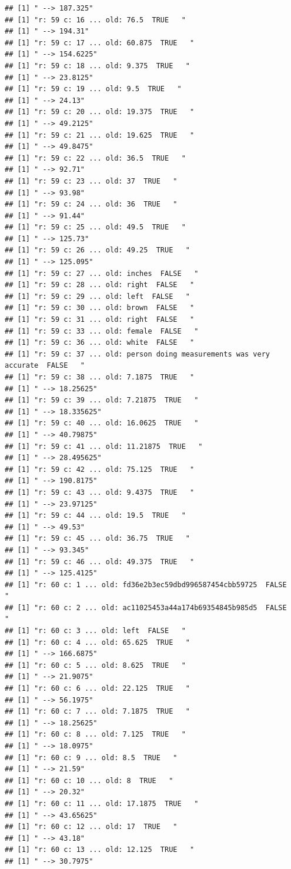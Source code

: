 \documentclass[]{article}
\begin{document}
\begin{verbatim}
## [1] " --> 187.325"
## [1] "r: 59 c: 16 ... old: 76.5  TRUE   "
## [1] " --> 194.31"
## [1] "r: 59 c: 17 ... old: 60.875  TRUE   "
## [1] " --> 154.6225"
## [1] "r: 59 c: 18 ... old: 9.375  TRUE   "
## [1] " --> 23.8125"
## [1] "r: 59 c: 19 ... old: 9.5  TRUE   "
## [1] " --> 24.13"
## [1] "r: 59 c: 20 ... old: 19.375  TRUE   "
## [1] " --> 49.2125"
## [1] "r: 59 c: 21 ... old: 19.625  TRUE   "
## [1] " --> 49.8475"
## [1] "r: 59 c: 22 ... old: 36.5  TRUE   "
## [1] " --> 92.71"
## [1] "r: 59 c: 23 ... old: 37  TRUE   "
## [1] " --> 93.98"
## [1] "r: 59 c: 24 ... old: 36  TRUE   "
## [1] " --> 91.44"
## [1] "r: 59 c: 25 ... old: 49.5  TRUE   "
## [1] " --> 125.73"
## [1] "r: 59 c: 26 ... old: 49.25  TRUE   "
## [1] " --> 125.095"
## [1] "r: 59 c: 27 ... old: inches  FALSE   "
## [1] "r: 59 c: 28 ... old: right  FALSE   "
## [1] "r: 59 c: 29 ... old: left  FALSE   "
## [1] "r: 59 c: 30 ... old: brown  FALSE   "
## [1] "r: 59 c: 31 ... old: right  FALSE   "
## [1] "r: 59 c: 33 ... old: female  FALSE   "
## [1] "r: 59 c: 36 ... old: white  FALSE   "
## [1] "r: 59 c: 37 ... old: person doing measurements was very accurate  FALSE   "
## [1] "r: 59 c: 38 ... old: 7.1875  TRUE   "
## [1] " --> 18.25625"
## [1] "r: 59 c: 39 ... old: 7.21875  TRUE   "
## [1] " --> 18.335625"
## [1] "r: 59 c: 40 ... old: 16.0625  TRUE   "
## [1] " --> 40.79875"
## [1] "r: 59 c: 41 ... old: 11.21875  TRUE   "
## [1] " --> 28.495625"
## [1] "r: 59 c: 42 ... old: 75.125  TRUE   "
## [1] " --> 190.8175"
## [1] "r: 59 c: 43 ... old: 9.4375  TRUE   "
## [1] " --> 23.97125"
## [1] "r: 59 c: 44 ... old: 19.5  TRUE   "
## [1] " --> 49.53"
## [1] "r: 59 c: 45 ... old: 36.75  TRUE   "
## [1] " --> 93.345"
## [1] "r: 59 c: 46 ... old: 49.375  TRUE   "
## [1] " --> 125.4125"
## [1] "r: 60 c: 1 ... old: fd36e2b3ec59dbd996587454cbb59725  FALSE   "
## [1] "r: 60 c: 2 ... old: ac11025453a44a174b69354845b985d5  FALSE   "
## [1] "r: 60 c: 3 ... old: left  FALSE   "
## [1] "r: 60 c: 4 ... old: 65.625  TRUE   "
## [1] " --> 166.6875"
## [1] "r: 60 c: 5 ... old: 8.625  TRUE   "
## [1] " --> 21.9075"
## [1] "r: 60 c: 6 ... old: 22.125  TRUE   "
## [1] " --> 56.1975"
## [1] "r: 60 c: 7 ... old: 7.1875  TRUE   "
## [1] " --> 18.25625"
## [1] "r: 60 c: 8 ... old: 7.125  TRUE   "
## [1] " --> 18.0975"
## [1] "r: 60 c: 9 ... old: 8.5  TRUE   "
## [1] " --> 21.59"
## [1] "r: 60 c: 10 ... old: 8  TRUE   "
## [1] " --> 20.32"
## [1] "r: 60 c: 11 ... old: 17.1875  TRUE   "
## [1] " --> 43.65625"
## [1] "r: 60 c: 12 ... old: 17  TRUE   "
## [1] " --> 43.18"
## [1] "r: 60 c: 13 ... old: 12.125  TRUE   "
## [1] " --> 30.7975"

\end{verbatim}
\end{document}

